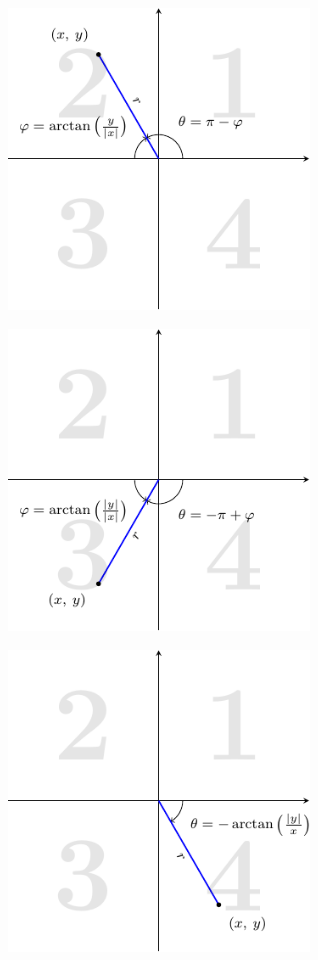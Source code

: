 \documentclass{article}
\begin{document}
\begin{figure}[H]
    \centering
    \includegraphics[width=8cm]{figures/Arg-q2.pdf}
\end{figure}
\begin{figure}[H]
    \centering
    \includegraphics[width=8cm]{figures/Arg-q3.pdf}
\end{figure}
\begin{figure}[H]
    \centering
    \includegraphics[width=8cm]{figures/Arg-q4.pdf}
\end{figure}
\end{document}
